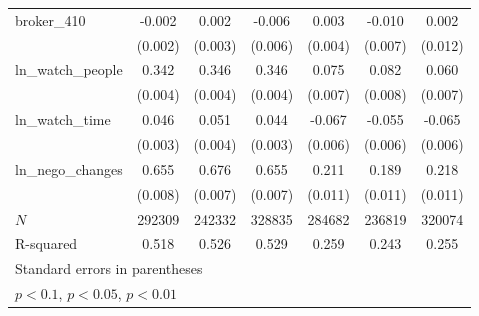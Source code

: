 {\begin{adjustbox}{max width=\textwidth}
\begin{tabular}{l*{6}{c}}
\addlinespace
broker\_410  &      -0.002         &       0.002         &      -0.006         &       0.003         &      -0.010         &       0.002         \\
            &     (0.002)         &     (0.003)         &     (0.006)         &     (0.004)         &     (0.007)         &     (0.012)         \\
\addlinespace
ln\_watch\_people&       0.342\sym{***}&       0.346\sym{***}&       0.346\sym{***}&       0.075\sym{***}&       0.082\sym{***}&       0.060\sym{***}\\
            &     (0.004)         &     (0.004)         &     (0.004)         &     (0.007)         &     (0.008)         &     (0.007)         \\
\addlinespace
ln\_watch\_time&       0.046\sym{***}&       0.051\sym{***}&       0.044\sym{***}&      -0.067\sym{***}&      -0.055\sym{***}&      -0.065\sym{***}\\
            &     (0.003)         &     (0.004)         &     (0.003)         &     (0.006)         &     (0.006)         &     (0.006)         \\
\addlinespace
ln\_nego\_changes&       0.655\sym{***}&       0.676\sym{***}&       0.655\sym{***}&       0.211\sym{***}&       0.189\sym{***}&       0.218\sym{***}\\
            &     (0.008)         &     (0.007)         &     (0.007)         &     (0.011)         &     (0.011)         &     (0.011)         \\
\midrule
\(N\)       &      292309         &      242332         &      328835         &      284682         &      236819         &      320074         \\
R-squared   &       0.518         &       0.526         &       0.529         &       0.259         &       0.243         &       0.255         \\
\bottomrule
\multicolumn{7}{l}{\footnotesize Standard errors in parentheses}\\
\multicolumn{7}{l}{\footnotesize \sym{*} \(p<0.1\), \sym{**} \(p<0.05\), \sym{***} \(p<0.01\)}\\
\end{tabular}
\end{adjustbox}
}
